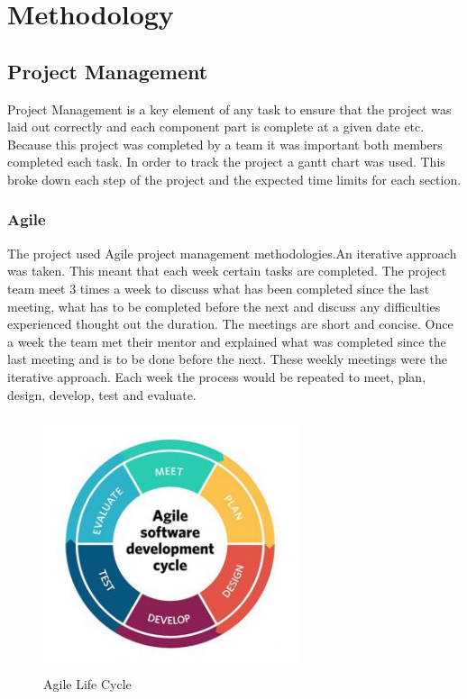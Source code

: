 \chapter{Methodology}
\section{Project Management}

Project Management is a key element of any task to ensure that the project was laid out correctly and each component part is complete at a given date etc. Because this project was completed by a team it was important both members completed each task. In order to track the project a gantt chart was used. This broke down each step of the project and the expected time limits for each section.

\subsection{Agile}

The project used Agile project management methodologies.An iterative approach was taken. This meant that each week certain tasks are completed. The project team meet 3 times a week to discuss what has been completed since the last meeting, what has to be completed before the next and discuss any  difficulties experienced thought out the duration. The meetings are short and concise. Once a week the team met their mentor and explained what was completed since the last meeting and is to be done before the next. These weekly meetings were the iterative approach. Each week the process would be repeated to meet, plan, design, develop, test and evaluate.

\begin{figure}[ht!]
    \centering
 \includegraphics[width=75mm, height=75mm,scale=0.5]{img/agile.jpg}
\caption{Agile Life Cycle}
\label{fig:agile}
\end{figure}

